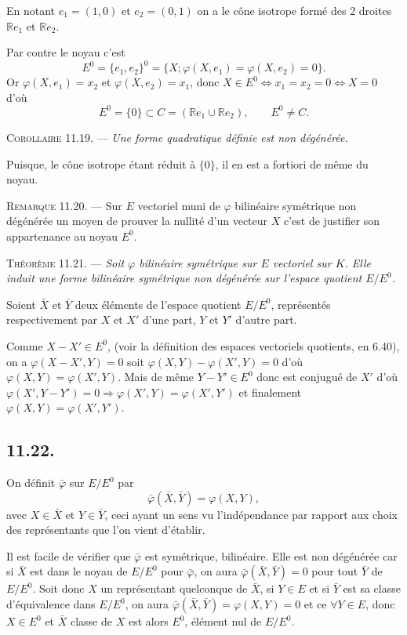 En notant $e_1=(1,0)$ et $e_2=(0,1)$ on a le cône isotrope formé des 2 droites $\mathbb Re_1$ et $\mathbb Re_2$.

Par contre le noyau c'est
\[
E^0=\{e_1,e_2\}^0=\{X;\varphi(X,e_1)=\varphi(X,e_2)=0\}.
\]
Or $\varphi(X,e_1)=x_2$ et $\varphi(X,e_2)=x_1$, donc $X\in E^0\Longleftrightarrow x_1=x_2=0\Longleftrightarrow X=0$ d'où
\[
E^0=\{0\}\subset C=(\mathbb Re_1\cup\mathbb Re_2),\qquad E^0\ne C.
\]

\medskip\noindent\textsc{Corollaire 11.19.} --- \emph{Une forme quadratique définie est non dégénérée.}

Puisque, le cône isotrope étant réduit à $\{0\}$, il en est a fortiori de même du noyau. \bookend

\medskip\noindent\textsc{Remarque 11.20.} --- Sur $E$ vectoriel muni de $\varphi$ bilinéaire symétrique non dégénérée un moyen de prouver la nullité d'un vecteur $X$ c'est de justifier son appartenance au noyau $E^0$.

\medskip\noindent\textsc{Théorème 11.21.} --- \emph{Soit $\varphi$ bilinéaire symétrique sur $E$ vectoriel sur $K$. Elle induit une forme bilinéaire symétrique non dégénérée sur l'espace quotient $E/E^0$.}

Soient $\bar X$ et $\bar Y$ deux éléments de l'espace quotient $E/E^0$, représentés respectivement par $X$ et $X'$ d'une part, $Y$ et $Y'$ d'autre part.

Comme $X-X'\in E^0$, (voir la définition des espaces vectoriels quotients, en 6.40), on a $\varphi(X-X',Y)=0$ soit $\varphi(X,Y)-\varphi(X',Y)=0$ d'où $\varphi(X,Y)=\varphi(X',Y)$. Mais de même $Y-Y'\in E^0$ donc est conjugué de $X'$ d'où $\varphi(X',Y-Y')=0\Rightarrow\varphi(X',Y)=\varphi(X',Y')$ et finalement $\varphi(X,Y)=\varphi(X',Y')$.

\subsection*{11.22.}
On définit $\bar\varphi$ sur $E/E^0$ par
\[
\bar\varphi(\bar X,\bar Y)=\varphi(X,Y),
\]
avec $X\in\bar X$ et $Y\in\bar Y$, ceci ayant un sens vu l'indépendance par rapport aux choix des représentants que l'on vient d'établir.

Il est facile de vérifier que $\bar\varphi$ est symétrique, bilinéaire. Elle est non dégénérée car si $\bar X$ est dans le noyau de $E/E^0$ pour $\bar\varphi$, on aura $\bar\varphi(\bar X,\bar Y)=0$ pour tout $\bar Y$ de $E/E^0$. Soit donc $X$ un représentant quelconque de $\bar X$, si $Y\in E$ et si $\bar Y$ est sa classe d'équivalence dans $E/E^0$, on aura $\bar\varphi(\bar X,\bar Y)=\varphi(X,Y)=0$ et ce $\forall Y\in E$, donc $X\in E^0$ et $\bar X$ classe de $X$ est alors $E^0$, élément nul de $E/E^0$. \bookend

